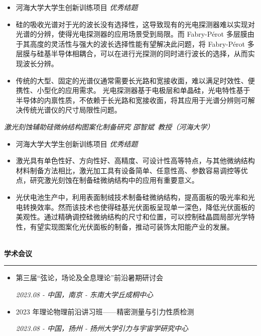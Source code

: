 \documentclass[12pt]{article}
\renewcommand*{\section}[1]{
    ~\\ \noindent \textbf{#1} \medskip \hrule \medskip
}
\begin{document}
\begin{itemize}
    \item 河海大学大学生创新训练项目 \textit{优秀结题}
    \item 硅的吸收光谱对于光的波长没有选择性，这导致现有的光电探测器难以实现对光谱的分辨，使得光电探测器的应用场景受到局限。而 Fabry-P\'{e}rot 多层膜由于其高度的灵活性与强大的波长选择性能有望解决此问题，将 Fabry-P\'{e}rot 多层膜与硅基半导体相耦合，可以在进行光探测的同时进行波长的选择，从而实现波长分辨。
    \item 传统的大型、固定的光谱仪通常需要长光路和宽接收面，难以满足时效性、便携性、小型化的应用需求。 光电探测器基于电极层和单晶硅，光电特性基于半导体的内禀性质，不依赖于长光路和宽接收面，将其应用于光谱分辨则可解决传统光谱仪的尺寸局限性问题。
\end{itemize}

\smallskip \quad \textit{激光刻蚀辅助硅微纳结构图案化制备研究 \hfill 邵智斌\ 教授（河海大学）}

\begin{itemize}
    \item 河海大学大学生创新训练项目 \textit{优秀结题}
    \item 激光具有单色性好、方向性好、高精度、可设计性高等特点，与其他微纳结构材料制备方法相比，激光加工具有设备简单、任意性高、参数容易调控等优点，研究激光刻蚀在制备硅微纳结构中的应用有重要意义。
    \item 光伏电池生产中，利用表面制绒技术制备硅微纳结构，提高面板的吸光率和光电转换效率。然而该技术也使得硅基光伏面板呈现单一深色，降低光伏面板的美观性。通过精确调控硅微纳结构的尺寸和位置，可以控制硅晶圆局部光学特性，有望实现图案化光伏面板的制备，推动可装饰太阳能产业的发展。
\end{itemize}


\section{学术会议}

\begin{itemize}
    \item 第三届“弦论，场论及全息理论”前沿暑期研讨会

    \hfill \textit{2023.08 - 中国，南京 - 东南大学丘成桐中心}
    \item 2023 年理论物理前沿讲习班——精密测量与引力性质检测

    \hfill \textit{2023.08 - 中国，扬州 - 扬州大学引力与宇宙学研究中心}
\end{itemize}
\end{document}
